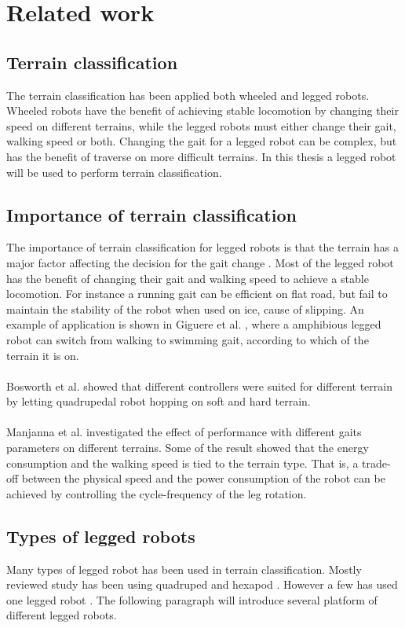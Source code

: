 \documentclass[USenglish]{ifimaster}  %
\begin{document}
\section{Related work}

\subsection{Terrain classification}
The terrain classification has been applied both wheeled and legged robots. Wheeled robots have the benefit of achieving stable locomotion by changing their speed on different terrains, while the legged robots must either change their gait, walking speed or both. Changing the gait for a legged robot can be complex, but has the benefit of traverse on more difficult terrains. In this thesis a legged robot will be used to perform terrain classification.

\subsection{Importance of terrain classification}
The importance of terrain classification for legged robots is that the terrain has a major factor affecting the decision for the gait change \cite{6569179}. Most of the legged robot has the benefit of changing their gait and walking speed to achieve a stable locomotion. For instance a running gait can be efficient on flat road, but fail to maintain the stability of the robot when used on ice, cause of slipping. An example of application is shown in Giguere et al. \cite{Giguere06environmentidentification}, where a amphibious legged robot can switch from walking to swimming gait, according to which of the terrain it is on. 
\\
\\
Bosworth et al. \cite{7487541} showed that different controllers were suited for different terrain by letting quadrupedal robot hopping on soft and hard terrain. 
\\
\\
Manjanna et al. \cite{6569179} investigated the effect of performance with different gaits parameters on different terrains. Some of the result showed that the energy consumption and the walking speed is tied to the terrain type. That is, a trade-off between the physical speed and the power consumption of the robot can be achieved by controlling the cycle-frequency of the leg rotation.


\subsection{Types of legged robots}
Many types of legged robot has been used in terrain classification. Mostly reviewed study has been using quadruped \cite{6784609,littleDog,6849778,Hoffmann20141790} and hexapod \cite{Walas2015,26b23e912c654fe4b7478fd910130195,6569179}. However a few has used one legged robot \cite{5602459}. The following paragraph will introduce several platform of different legged robots.
\end{document}
